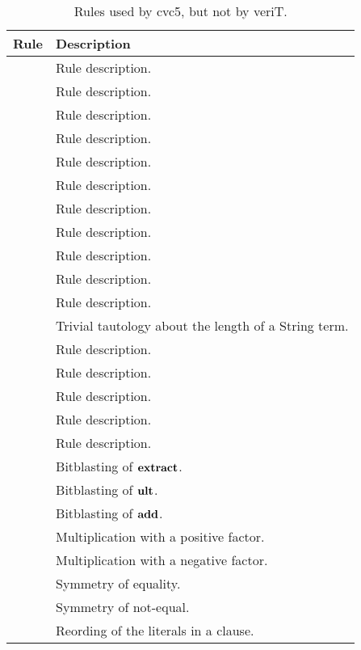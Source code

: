 \begin{xltabular}{\linewidth}{l X}
\caption{Rules used by cvc5, but not by veriT.}
\label{rule-tab:cvc5}\\
  Rule & Description \\
  \hline
{} & Rule description. \\
 & Rule description. \\
 & Rule description. \\
 & Rule description. \\
 & Rule description. \\
 & Rule description. \\
 & Rule description. \\
 & Rule description. \\
 & Rule description. \\
 & Rule description. \\
 & Rule description. \\
 & Trivial tautology about the length of a String term. \\
 & Rule description. \\
 & Rule description. \\
 & Rule description. \\
 & Rule description. \\
 & Rule description. \\
 & Bitblasting of $\mathbf{extract}$. \\
 & Bitblasting of $\mathbf{ult}$. \\
 & Bitblasting of $\mathbf{add}$. \\
 & Multiplication with a positive factor. \\
 & Multiplication with a negative factor.\\
     & Symmetry of equality. \\
 & Symmetry of not-equal.\\
 & Reording of the literals in a clause.\\
\end{xltabular}

